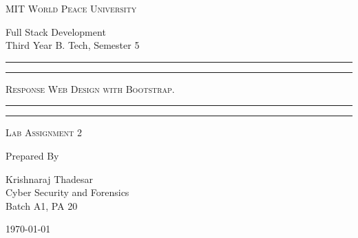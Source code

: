\documentclass[11pt]{article}
\begin{document}
\begin{titlepage}
    \centering


    \huge\textsc{
        MIT World Peace University
    }\\

    \vspace{0.75\baselineskip} %

    \LARGE{
        Full Stack Development\\
        Third Year B. Tech, Semester 5
    }

    \vfill %


    \rule{\textwidth}{1.6pt}\vspace*{-\baselineskip}\vspace*{2pt}
    \rule{\textwidth}{0.6pt}
    \vspace{0.75\baselineskip} %



    \huge{\textsc{
            Response Web Design with Bootstrap.
        }} \\



    \vspace{0.5\baselineskip} %
    \rule{\textwidth}{0.6pt}\vspace*{-\baselineskip}\vspace*{2.8pt}
    \rule{\textwidth}{1.6pt}

    \vspace{1\baselineskip} %


    \LARGE\textsc{
        Lab Assignment 2
    } %
    \vfill


    Prepared By
    \vspace{0.5\baselineskip} %

    \Large{
        Krishnaraj Thadesar \\
        Cyber Security and Forensics\\
        Batch A1, PA 20
    }


    \vspace{0.5\baselineskip} %
    \today

\end{titlepage}
\end{document}
